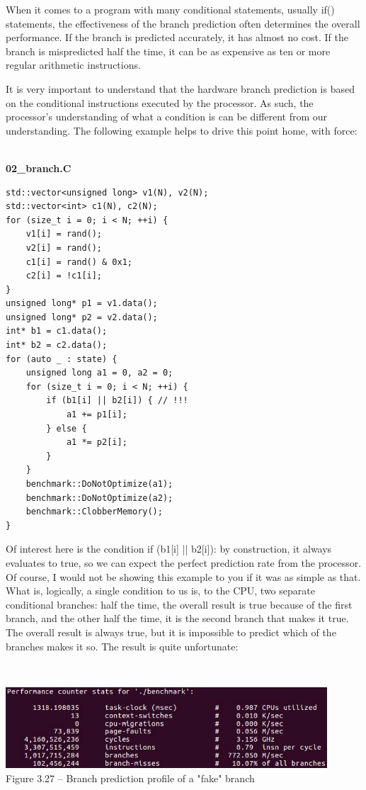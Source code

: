 When it comes to a program with many conditional statements, usually if() statements, the effectiveness of the branch prediction often determines the overall performance. If the branch is predicted accurately, it has almost no cost. If the branch is mispredicted half the time, it can be as expensive as ten or more regular arithmetic instructions.

It is very important to understand that the hardware branch prediction is based on the conditional instructions executed by the processor. As such, the processor's understanding of what a condition is can be different from our understanding. The following example helps to drive this point home, with force:

\hspace*{\fill} \\ %
\noindent
\textbf{02\_branch.C}
\begin{lstlisting}[style=styleCXX]
std::vector<unsigned long> v1(N), v2(N);
std::vector<int> c1(N), c2(N);
for (size_t i = 0; i < N; ++i) {
	v1[i] = rand();
	v2[i] = rand();
	c1[i] = rand() & 0x1;
	c2[i] = !c1[i];
}
unsigned long* p1 = v1.data();
unsigned long* p2 = v2.data();
int* b1 = c1.data();
int* b2 = c2.data();
for (auto _ : state) {
	unsigned long a1 = 0, a2 = 0;
	for (size_t i = 0; i < N; ++i) {
		if (b1[i] || b2[i]) { // !!!
			a1 += p1[i];
		} else {
			a1 *= p2[i];
		}
	}
	benchmark::DoNotOptimize(a1);
	benchmark::DoNotOptimize(a2);
	benchmark::ClobberMemory();
}
\end{lstlisting}

Of interest here is the condition if (b1[i] || b2[i]): by construction, it always evaluates to true, so we can expect the perfect prediction rate from the processor. Of course, I would not be showing this example to you if it was as simple as that. What is, logically, a single condition to us is, to the CPU, two separate conditional branches: half the time, the overall result is true because of the first branch, and the other half the time, it is the second branch that makes it true. The overall result is always true, but it is impossible to predict which of the branches makes it so. The result is quite unfortunate:

\hspace*{\fill} \\ %
\begin{center}
\includegraphics[width=0.9\textwidth]{content/1/chapter3/images/27.jpg}\\
Figure 3.27 – Branch prediction profile of a "fake" branch
\end{center}

